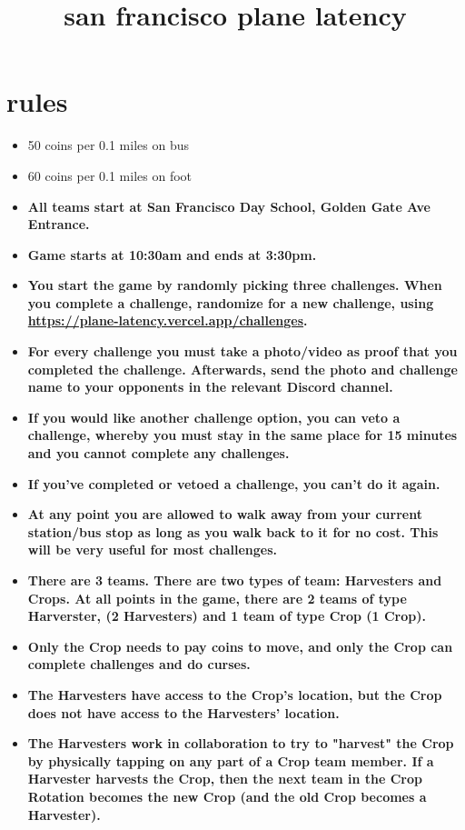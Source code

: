 \documentclass{article}
\title{san francisco plane latency}
\author{}
\date{}
\begin{document}
\maketitle

\section{rules}
\begin{itemize}
    \item 50 coins per 0.1 miles on bus
    \item 60 coins per 0.1 miles on foot
    \item \textbf{All teams start at San Francisco Day School, Golden Gate Ave Entrance.}
    \item \textbf{Game starts at 10:30am and ends at 3:30pm.}
    \item \textbf{You start the game by randomly picking three challenges. When you complete a challenge, randomize for a new challenge, using \url{https://plane-latency.vercel.app/challenges}.}
    \item \textbf{For every challenge you must take a photo/video as proof that you completed the challenge. Afterwards, send the photo and challenge name to your opponents in the relevant Discord channel.}
    \item \textbf{If you would like another challenge option, you can veto a challenge, whereby you must stay in the same place for 15 minutes and you cannot complete any challenges.}
    \item \textbf{If you've completed or vetoed a challenge, you can't do it again.}
    \item \textbf{At any point you are allowed to walk away from your current station/bus stop as long as you walk back to it for no cost. This will be very useful for most challenges.}
    \item \textbf{There are 3 teams. There are two types of team: Harvesters and Crops. At all points in the game, there are 2 teams of type Harverster, (2 Harvesters) and 1 team of type Crop (1 Crop).}
    \item \textbf{Only the Crop needs to pay coins to move, and only the Crop can complete challenges and do curses.}
    \item \textbf{The Harvesters have access to the Crop's location, but the Crop does not have access to the Harvesters' location.}
    \item \textbf{The Harvesters work in collaboration to try to "harvest" the Crop by physically tapping on any part of a Crop team member. If a Harvester harvests the Crop, then the next team in the Crop Rotation becomes the new Crop (and the old Crop becomes a Harvester). }

\end{itemize}
\end{document}
